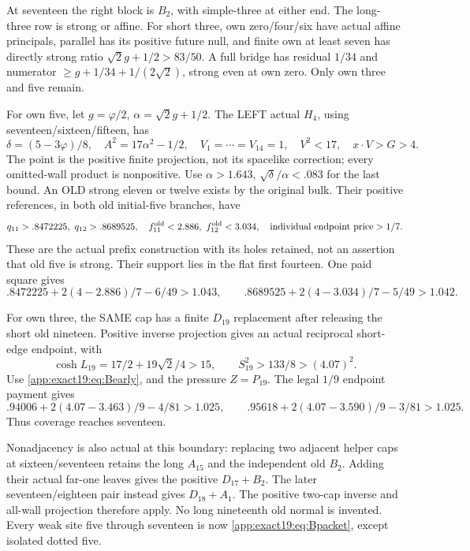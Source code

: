 \documentclass[11pt]{article}
\theoremstyle{definition}
\theoremstyle{remark}
\begin{document}
At seventeen the right block is
\(B_2\), with simple-three at either
end.
The long-three row is strong or
affine.
For short three, own zero/four/six
have actual affine principals,
parallel has its positive future
null, and finite own at least seven
has directly strong ratio
\(\sqrt2g+1/2>83/50\).
A full bridge has residual \(1/34\)
and numerator
\(\ge g+1/34+1/(2\sqrt2)\), strong
even at own zero.
Only own three and five remain.

For own five, let \(g=\varphi/2\),
\(\alpha=\sqrt2g+1/2\).
The LEFT actual \(H_4\), using
seventeen/sixteen/fifteen, has
\[
 \delta=(5-3\varphi)/8,\quad A^2=17\alpha^2-1/2,
 \quad V_1=\cdots=V_{14}=1,\quad V^2<17,
                    \quad x\cdot V>G>4 .
\]
The point is the positive finite
projection, not its spacelike
correction; every omitted-wall
product is nonpositive.
Use \(\alpha>1.643\),
\(\sqrt\delta/\alpha<.083\)
for the last bound.
An OLD strong eleven or twelve
exists by the original bulk.
Their positive references, in both
old initial-five branches, have
\[
 q_{11}>.8472225,\ q_{12}>.8689525,\quad
 f_{11}^{\rm old}<2.886,\ f_{12}^{\rm old}<3.034,
                    \quad\text{individual endpoint price}>1/7 .
\]
These are the actual prefix
construction with its holes retained,
not an assertion that old five is
strong.
Their support lies in the flat
first fourteen.
One paid square gives
\[
 .8472225+2(4-2.886)/7-6/49>1.043,\qquad
 .8689525+2(4-3.034)/7-5/49>1.042 .
\]

For own three, the SAME cap has a
finite \(D_{19}\) replacement after
releasing the short old nineteen.
Positive inverse projection gives
an actual reciprocal short-edge
endpoint, with
\[
 \cosh L_{19}=17/2+19\sqrt2/4>15,\qquad
               S_{19}^2>133/8>(4.07)^2 .
\]
Use \eqref{app:exact19:eq:Bearly},
and the pressure \(Z=P_{19}\).
The legal \(1/9\) endpoint payment
gives
\[
 .94006+2(4.07-3.463)/9-4/81>1.025,\qquad
 .95618+2(4.07-3.590)/9-3/81>1.025 .
\]
Thus coverage reaches seventeen.

Nonadjacency is also actual at this
boundary: replacing two adjacent
helper caps at sixteen/seventeen
retains the long \(A_{15}\) and
the independent old \(B_2\).
Adding their actual far-one leaves
gives the positive \(D_{17}+B_2\).
The later seventeen/eighteen pair
instead gives \(D_{18}+A_1\).
The positive two-cap inverse and
all-wall projection therefore apply.
No long nineteenth old normal is
invented.
Every weak site five through
seventeen is now
\eqref{app:exact19:eq:Bpacket},
except isolated dotted five.
\end{document}
